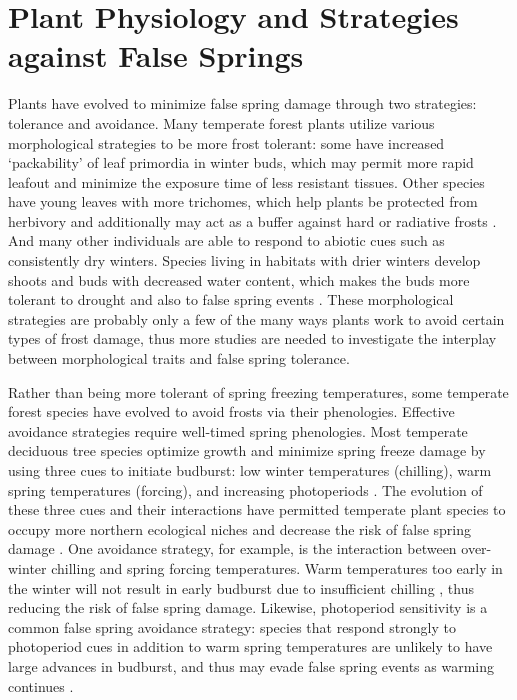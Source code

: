\documentclass{article}\usepackage[]{graphicx}\usepackage[]{color}
\begin{document}
\section* {Plant Physiology and Strategies against False Springs}
Plants have evolved to minimize false spring damage through two strategies: tolerance and avoidance. Many temperate forest plants utilize various morphological strategies to be more frost tolerant: some have increased `packability' of leaf primordia in winter buds, which may permit more rapid leafout \citep{Edwards2017} and minimize the exposure time of less resistant tissues. Other species have young leaves with more trichomes, which help plants be protected from herbivory and additionally may act as a buffer against hard or radiative frosts \citep{Agrawal2004, Prozherina2003}. And many other individuals are able to respond to abiotic cues such as consistently dry winters. Species living in habitats with drier winters develop shoots and buds with decreased water content, which makes the buds more tolerant to drought and also to false spring events \citep{Beck2007, Kathke2011, Hofmann2015, Morin2007,  Muffler2016, Nielsen2009, Poirier2010}. These morphological strategies are probably only a few of the many ways plants work to avoid certain types of frost damage, thus more studies are needed to investigate the interplay between morphological traits and false spring tolerance. 

Rather than being more tolerant of spring freezing temperatures, some temperate forest species have evolved to avoid frosts via their phenologies. Effective avoidance strategies require well-timed spring phenologies. Most temperate deciduous tree species optimize growth and minimize spring freeze damage by using three cues to initiate budburst: low winter temperatures (chilling), warm spring temperatures (forcing), and increasing photoperiods \citep{Chuine2010}. The evolution of these three cues and their interactions have permitted temperate plant species to occupy more northern ecological niches \citep{Kollas2014} and decrease the risk of false spring damage %
\citep{Charrier2011}. One avoidance strategy, for example, is the interaction between over-winter chilling and spring forcing temperatures. Warm temperatures too early in the winter %
will not result in early budburst due to insufficient chilling \citep{Basler2012}, thus reducing the risk of false spring damage. Likewise, photoperiod sensitivity is a common false spring avoidance strategy: species that respond strongly to photoperiod cues %
in addition to warm spring temperatures are unlikely to have large advances in budburst, and thus may evade false spring events as warming continues \citep{Basler2014}. 
\end{document}
